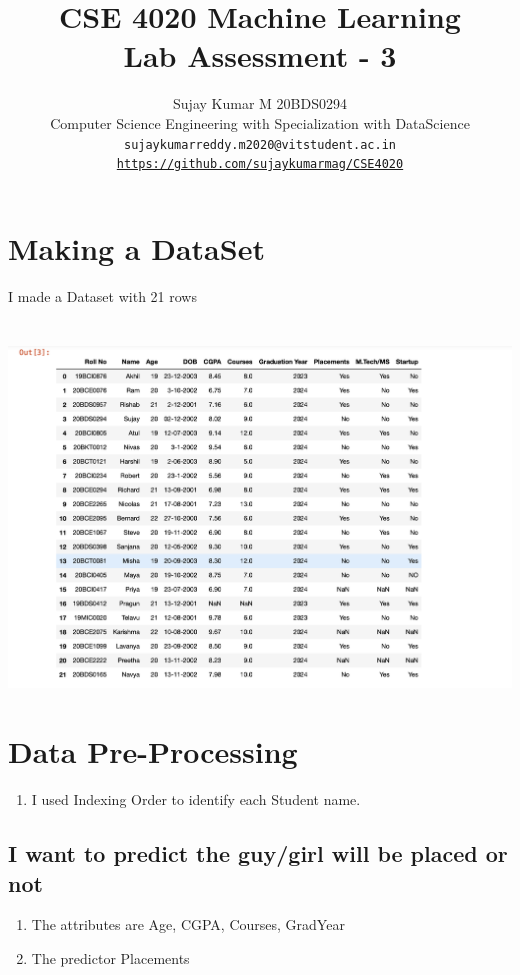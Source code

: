 \documentclass{article}
\title{CSE 4020 Machine Learning \\ Lab Assessment - 3  }
\author{Sujay Kumar M 20BDS0294\\ \small Computer Science Engineering with Specialization with DataScience\\ \tt sujaykumarreddy.m2020@vitstudent.ac.in
	\\ \url{https://github.com/sujaykumarmag/CSE4020}}
\begin{document}
	\maketitle
	\section{Making a DataSet}
	I made a Dataset with 21 rows \\\\\\
	\includegraphics[scale=0.6]{images/1.png}
	
	\section{Data Pre-Processing}
	\begin{enumerate}
		\item I used Indexing Order to identify each Student name.
	\end{enumerate}
	
	\subsection{I want to predict the guy/girl will be placed or not }
	\begin{enumerate}
		\item The attributes are Age, CGPA, Courses, GradYear
		\item The predictor Placements
	\end{enumerate}
	
\end{document}
